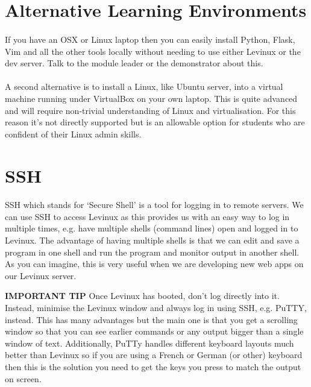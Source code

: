 \documentclass[12pt, a4paper, twoside]{book}
\begin{document}
\section{Alternative Learning Environments}
\label{alternatives}
\paragraph{} If you have an OSX or Linux laptop then you can easily install Python, Flask, Vim and all the other tools locally without needing to use either Levinux or the dev server. Talk to the module leader or the demonstrator about this.

\paragraph{} A second alternative is to install a Linux, like Ubuntu server, into a virtual machine running under VirtualBox on your own laptop. This is quite advanced and will require non-trivial understanding of Linux and virtualisation. For this reason it's not directly supported but is an allowable option for students who are confident of their Linux admin skills.

\section{SSH}
\label{ssh}
\paragraph{} SSH which stands for `Secure Shell' is a tool for logging in to remote servers. We can use SSH to access Levinux as this provides us with an easy way to log in multiple times, e.g. have multiple shells (command lines) open and logged in to Levinux. The advantage of having multiple shells is that we can edit and save a program in one shell and run the program and monitor output in another shell. As you can imagine, this is very useful when we are developing new web apps on our Levinux server.

\begin{framed}
\textbf{IMPORTANT TIP} Once Levinux has booted, don't log directly into it. Instead, minimise the Levinux window and always log in using SSH, e.g. PuTTY, instead. This has many advantages but the main one is that you get a scrolling window so that you can see earlier commands or any output bigger than a single window of text. Additionally, PuTTy handles different keyboard layouts much better than Levinux so if you are using a French or German (or other) keyboard then this is the solution you need to get the keys you press to match the output on screen.
\end{framed}
\end{document}
